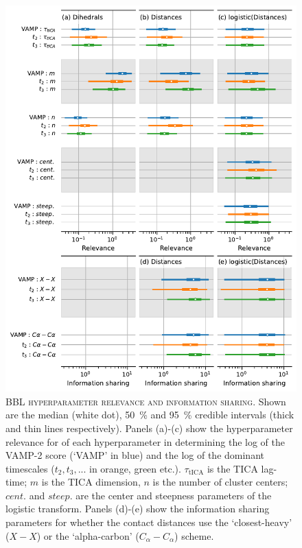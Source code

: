 \documentclass{article}
\begin{document}
\begin{figure}
    \centering
    \includegraphics[height=0.8\textheight]{figures/sensitivities/2wav_sensitivity.pdf}
    \caption{\textsc{BBL hyperparameter relevance and information sharing}. Shown are the  median (white dot), \SI{50}{\percent} and \SI{95}{\percent} credible intervals (thick and thin lines respectively).  Panels (a)-(c) show the hyperparameter relevance for of each hyperparameter in determining the log of the VAMP-2 score (`VAMP' in blue) and the log of the dominant timescales ($t_{2}, t_{3}, ...$ in orange, green etc.). $\tau_{\mathrm{tICA}}$ is the TICA lag-time; $m$ is the TICA dimension, $n$ is the number of cluster centers; $cent.$ and $steep.$ are the center and steepness parameters of the logistic transform. Panels (d)-(e) show the information sharing parameters for whether the contact distances use the `closest-heavy' ($X-X$) or the `alpha-carbon' ($C_{\alpha}-C_{\alpha}$) scheme.  }
    \label{fig:2wav_sense}
\end{figure}
\end{document}
